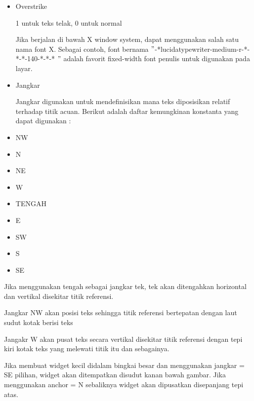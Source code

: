 \documentclass{wileySix}
\begin{document}
\begin{myEnumerate}
\begin{myEnumerate}
{\begin{myEnumerate}
\begin{itemize}
		\noindent 
		\item Overstrike \par
		1 untuk teks telak, 0 untuk normal \par
		Jika berjalan di bawah X window system, dapat menggunakan salah satu nama font X. Sebagai contoh, font bernama  $ " $-*lucidatypewriter-medium-r-*-*-*-140-*-*-* $ " $ adalah favorit fixed-width font penulis untuk digunakan pada layar. \par
		\noindent 
		\item Jangkar \par
		\noindent 
		Jangkar digunakan untuk mendefinisikan mana teks diposisikan relatif terhadap titik acuan. Berikut adalah daftar kemungkinan konstanta yang dapat digunakan : \par
		\noindent 
		\item NW \par
		\noindent 
		\item N \par
		\noindent 
		\item NE \par
		\noindent 
		\item W \par
		\noindent 
		\item TENGAH \par
		\noindent 
		\item E \par
		\noindent 
		\item SW \par
		\noindent 
		\item S \par
		\noindent 
		\item SE\end{itemize}
	\par
	\vspace{12pt}
	Jika menggunakan tengah sebagai jangkar tek, tek akan ditengahkan horizontal dan vertikal disekitar titik referensi. \par
	Jangkar NW akan posisi teks sehingga titik referensi bertepatan dengan laut sudut kotak berisi teks \par
	Jangakr W akan pusat teks secara vertikal disekitar titik referensi dengan tepi kiri kotak teks yang melewati titik itu dan sebagainya. \par
	Jika membuat widget kecil didalam bingkai besar dan menggunakan jangkar = SE pilihan, widget akan ditempatkan disudut kanan bawah gambar. Jika menggunakan anchor = N sebaliknya widget akan dipusatkan disepanjang tepi atas. \par

\end{myEnumerate}}
\end{myEnumerate}
\end{myEnumerate}
\end{document}
